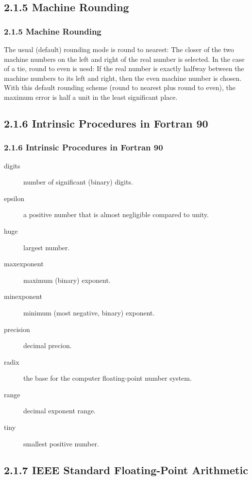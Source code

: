 \documentclass[notheorems,mathserif,table,compress]{beamer}  %
\begin{document}
\subsection{2.1.5 Machine Rounding}

\begin{frame}
  \frametitle{2.1.5 Machine Rounding}
  The usual (default) rounding mode is round to nearest: The closer of the two machine numbers on the left and right of the real number is selected. In the case of a tie, round to even is uesd: If the real number is exactly halfway between the machine numbers to its left and right, then the even machine number is chosen.\\
  With this default rounding scheme (round to nearest plus round to even), the maximum error is half a unit in the least significant place.
\end{frame}


\subsection{2.1.6 Intrinsic Procedures in Fortran 90}

\begin{frame}
  \frametitle{2.1.6 Intrinsic Procedures in Fortran 90}
   \begin{description}
   \item[digits] number of significant (binary) digits.
   \item[epsilon] a positive number that is almost negligible compared to unity.
   \item[huge] largest number.
   \item[maxexponent] maximum (binary) exponent.
   \item[minexponent] minimum (most negative, binary) exponent.
   \item[precision] decimal precion.
   \item[radix] the base for the computer floating-point number system.
   \item[range] decimal exponent range.
   \item[tiny] smallest positive number.
   \end{description}
\end{frame}


\subsection{2.1.7 IEEE Standard Floating-Point Arithmetic}
\end{document}
